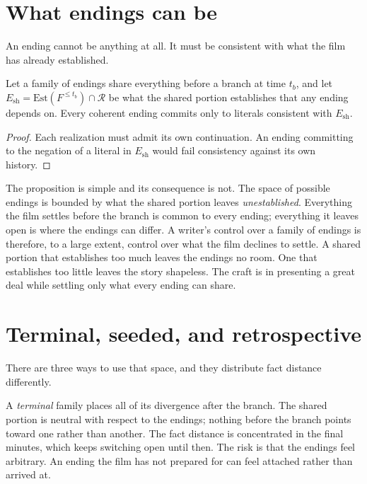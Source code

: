 \section{What endings can be}

An ending cannot be anything at all. It must be consistent with what the film has already established.

\begin{proposition}
Let a family of endings share everything before a branch at time $t_b$, and let $E_{\mathrm{sh}}=\mathrm{Est}(F^{\le t_b})\cap\mathcal R$ be what the shared portion establishes that any ending depends on. Every coherent ending commits only to literals consistent with $E_{\mathrm{sh}}$.
\end{proposition}

\begin{proof}
Each realization must admit its own continuation. An ending committing to the negation of a literal in $E_{\mathrm{sh}}$ would fail consistency against its own history.
\end{proof}

The proposition is simple and its consequence is not. The space of possible endings is bounded by what the shared portion leaves \emph{unestablished}. Everything the film settles before the branch is common to every ending; everything it leaves open is where the endings can differ. A writer's control over a family of endings is therefore, to a large extent, control over what the film declines to settle. A shared portion that establishes too much leaves the endings no room. One that establishes too little leaves the story shapeless. The craft is in presenting a great deal while settling only what every ending can share.

\section{Terminal, seeded, and retrospective}

There are three ways to use that space, and they distribute fact distance differently.

A \emph{terminal} family places all of its divergence after the branch. The shared portion is neutral with respect to the endings; nothing before the branch points toward one rather than another. The fact distance is concentrated in the final minutes, which keeps switching open until then. The risk is that the endings feel arbitrary. An ending the film has not prepared for can feel attached rather than arrived at.

